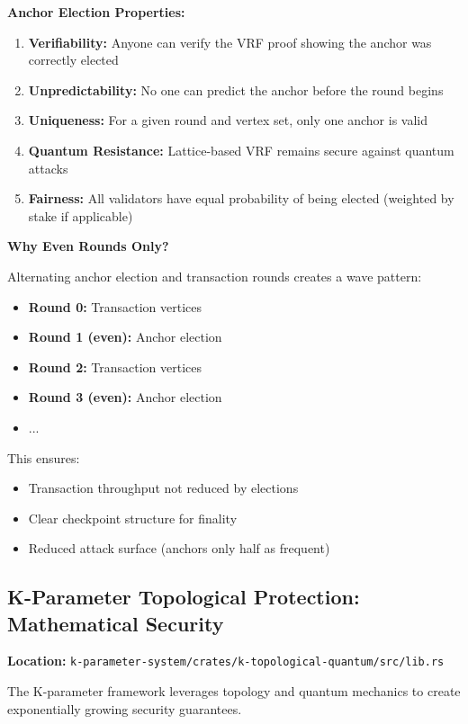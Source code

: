 \documentclass[11pt,a4paper]{article}
\begin{document}
\textbf{Anchor Election Properties:}
\begin{enumerate}[leftmargin=*]
\item \textbf{Verifiability:} Anyone can verify the VRF proof showing the anchor was correctly elected
\item \textbf{Unpredictability:} No one can predict the anchor before the round begins
\item \textbf{Uniqueness:} For a given round and vertex set, only one anchor is valid
\item \textbf{Quantum Resistance:} Lattice-based VRF remains secure against quantum attacks
\item \textbf{Fairness:} All validators have equal probability of being elected (weighted by stake if applicable)
\end{enumerate}

\textbf{Why Even Rounds Only?}

Alternating anchor election and transaction rounds creates a wave pattern:
\begin{itemize}[leftmargin=*]
\item \textbf{Round 0:} Transaction vertices
\item \textbf{Round 1 (even):} Anchor election
\item \textbf{Round 2:} Transaction vertices
\item \textbf{Round 3 (even):} Anchor election
\item ...
\end{itemize}

This ensures:
\begin{itemize}[leftmargin=*]
\item Transaction throughput not reduced by elections
\item Clear checkpoint structure for finality
\item Reduced attack surface (anchors only half as frequent)
\end{itemize}

\subsection{K-Parameter Topological Protection: Mathematical Security}

\textbf{Location:} \texttt{k-parameter-system/crates/k-topological-quantum/src/lib.rs}

The K-parameter framework leverages topology and quantum mechanics to create exponentially growing security guarantees.
\end{document}
